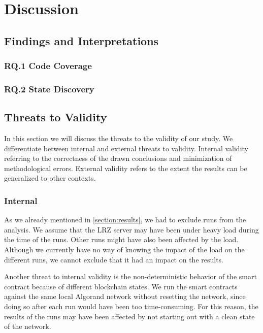 
\chapter{Discussion}\label{chapter:discussion}

\section{Findings and Interpretations}

\subsection*{RQ.1 Code Coverage}

\subsection*{RQ.2 State Discovery}

\section{Threats to Validity}
In this section we will discuss the threats to the validity of our study.
We differentiate between internal and external threats to validity.
Internal validity referring to the correctness of the drawn conclusions and minimization of methodological errors.
External validity refers to the extent the results can be generalized to other contexts.

\subsection*{Internal}
As we already mentioned in \ref{section:results}, we had to exclude runs from the analysis.
We assume that the LRZ server may have been under heavy load during the time of the runs.
Other runs might have also been affected by the load.
Although we currently have no way of knowing the impact of the load on the different runs, we cannot exclude that it had an impact on the results.

Another threat to internal validity is the non-deterministic behavior of the smart contract because of different blockchain states.
We run the smart contracts against the same local Algorand network without resetting the network, since doing so after each run would have been too time-consuming.
For this reason, the results of the runs may have been affected by not starting out with a clean state of the network.

